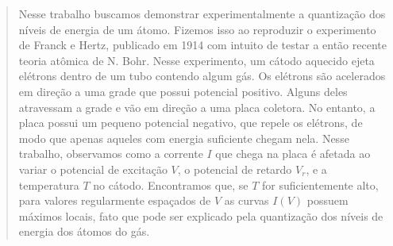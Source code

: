 \begin{abstract}

Nesse trabalho buscamos demonstrar experimentalmente a quantização dos níveis de energia de um átomo.
Fizemos isso ao reproduzir o experimento de Franck e Hertz, publicado em 1914 com intuito de testar a 
então recente teoria atômica de N. Bohr.
Nesse experimento, um cátodo aquecido ejeta elétrons dentro de um tubo contendo algum gás.
Os elétrons são acelerados em direção a uma grade que possui potencial positivo.
Alguns deles atravessam a grade e vão em direção a uma placa coletora.
No entanto, a placa possui um pequeno potencial negativo, que repele os elétrons, de modo que apenas 
aqueles com energia suficiente chegam nela.
Nesse trabalho, observamos como a corrente $I$ que chega na placa é afetada ao variar o potencial de excitação $V$, 
o potencial de retardo $V_r$, e a temperatura $T$ no cátodo. 
Encontramos que, se $T$ for suficientemente alto, para valores regularmente espaçados de $V$ as curvas $I(V)$ possuem máximos locais, fato que pode ser explicado pela quantização dos níveis de energia dos átomos do gás.

\end{abstract}
